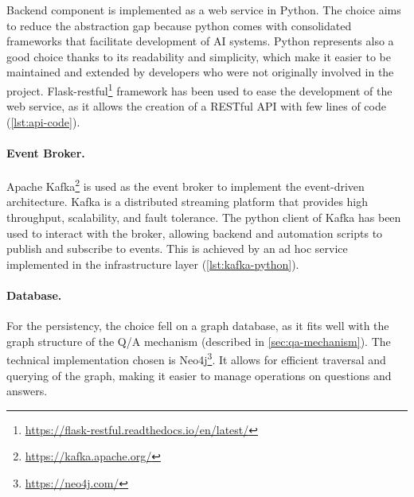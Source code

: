 \documentclass[12pt,a4paper,openright,twoside]{book}
\begin{document}

Backend component is implemented as a web service in Python. 
%
The choice aims to reduce the abstraction gap because python comes with consolidated frameworks that facilitate development of \ac{AI} systems.
%
Python represents also a good choice thanks to its readability and simplicity, which make it easier to be maintained and extended by developers who were not originally involved in the project.
%
Flask-restful\footnote{\url{https://flask-restful.readthedocs.io/en/latest/}} framework has been used to ease the development of the web service, as it allows the creation of a RESTful \ac{API} with few lines of code (\cref{lst:api-code}).





\paragraph{Event Broker.}

Apache Kafka\footnote{\url{https://kafka.apache.org/}} is used as the event broker to implement the event-driven architecture.
%
Kafka is a distributed streaming platform that provides high throughput, scalability, and fault tolerance.
%
The python client of Kafka has been used to interact with the broker, allowing backend and automation scripts to publish and subscribe to events.
%
This is achieved by an ad hoc service implemented in the infrastructure layer (\cref{lst:kafka-python}).





\paragraph{Database.}

For the persistency, the choice fell on a graph database, as it fits well with the graph structure of the \ac{Q/A} mechanism (described in \cref{sec:qa-mechanism}). The technical implementation chosen is Neo4j\footnote{\url{https://neo4j.com/}}.
%
It allows for efficient traversal and querying of the graph, making it easier to manage operations on questions and answers.
\end{document}

